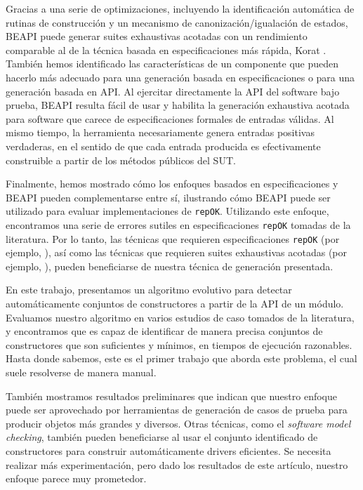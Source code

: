 Gracias a una serie de optimizaciones, incluyendo la identificación automática de 
rutinas de construcción y un mecanismo de canonización/igualación de estados, BEAPI puede generar suites exhaustivas acotadas con 
un rendimiento comparable al de la técnica basada en especificaciones más rápida, Korat \cite{Boyapati02}. También hemos identificado las
características de un componente que pueden hacerlo más adecuado para una generación basada en especificaciones o para una generación basada en API.
Al ejercitar directamente la API del software bajo prueba, BEAPI resulta fácil de usar y habilita la generación exhaustiva acotada para software que carece de especificaciones formales de entradas válidas. 
Al mismo tiempo, la herramienta necesariamente genera entradas positivas verdaderas, en el sentido de que cada entrada producida es efectivamente construible a partir de los métodos públicos del SUT.


Finalmente, hemos mostrado cómo los enfoques basados en especificaciones y BEAPI pueden complementarse entre sí, 
ilustrando cómo BEAPI puede ser utilizado para evaluar implementaciones de \texttt{repOK}. Utilizando este enfoque, 
encontramos una serie de errores sutiles en especificaciones \texttt{repOK} tomadas de la literatura. Por lo tanto, 
las técnicas que requieren especificaciones \texttt{repOK} (por ejemplo, \cite{Rosner15}), así como las técnicas que requieren 
suites exhaustivas acotadas (por ejemplo, \cite{Molina+2021}), pueden beneficiarse de nuestra técnica de generación presentada.



En este trabajo, presentamos un algoritmo evolutivo para detectar automáticamente conjuntos de constructores a partir de la API de un módulo. 
Evaluamos nuestro algoritmo en varios estudios de caso tomados de la literatura, y encontramos que es capaz de identificar de manera precisa conjuntos de constructores que son suficientes y mínimos, 
en tiempos de ejecución razonables. Hasta donde sabemos, este es el primer trabajo que aborda este problema, el cual suele resolverse de manera manual.

También mostramos resultados preliminares que indican que nuestro enfoque puede ser aprovechado por herramientas de generación de casos de prueba para producir objetos más grandes y diversos. 
Otras técnicas, como el \emph{software model checking}, también pueden beneficiarse al usar el conjunto identificado de constructores para construir automáticamente drivers eficientes.
Se necesita realizar más experimentación, pero dado los resultados de este artículo, nuestro enfoque parece muy prometedor.

